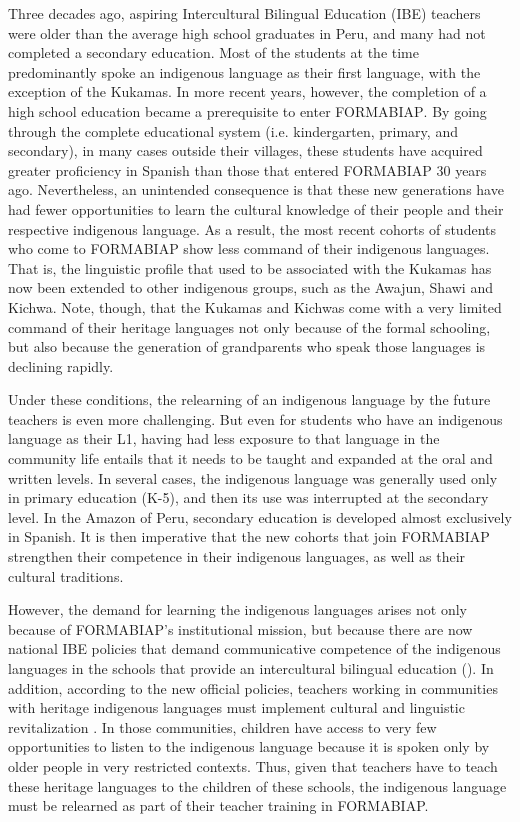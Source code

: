 \documentclass[output=paper]{langscibook}
\begin{document}
Three decades ago, aspiring Intercultural Bilingual Education (IBE) teachers were older than the average high school graduates in Peru, and many had not completed a secondary education. Most of the students at the time predominantly spoke an indigenous language as their first language, with the exception of the Kukamas. In more recent years, however, the completion of a high school education became a prerequisite to enter \textsc{FORMABIAP}. By going through the complete educational system (i.e. kindergarten, primary, and secondary), in many cases outside their villages, these students have acquired greater proficiency in Spanish than those that entered FORMABIAP 30 years ago. Nevertheless, an unintended consequence is that these new generations have had fewer opportunities to learn the cultural knowledge of their people and their respective indigenous language. As a result, the most recent cohorts of students who come to FORMABIAP show less command of their indigenous languages. That is, the linguistic profile that used to be associated with the Kukamas has now been extended to other indigenous groups, such as the Awajun, Shawi and Kichwa. Note, though, that the Kukamas and Kichwas come with a very limited command of their heritage languages not only ​​because of the formal schooling, but also because the generation of grandparents who speak those languages is declining rapidly.

Under these conditions, the relearning of an indigenous language by the future teachers is even more challenging. But even for students who have an indigenous language as their L1, having had less exposure to that language in the community life entails that it needs to be taught and expanded at the oral and written levels. In several cases, the indigenous language was generally used only in primary education (K-5), and then its use was interrupted at the secondary level. In the Amazon of Peru, secondary education is developed almost exclusively in Spanish. It is then imperative that the new cohorts that join FORMABIAP strengthen their competence in their indigenous languages, as well as their cultural traditions.

However, the demand for learning the indigenous languages arises not only because of FORMABIAP’s institutional mission, but because there are now national IBE policies that demand communicative competence of the indigenous languages in the schools that provide an intercultural bilingual education (\citealt{MinisteriodeEducacióndelPerú2016}). In addition, according to the new official policies, teachers working in communities with heritage indigenous languages must implement cultural and linguistic revitalization \citep{MinistryofEducationofPeru2016}. In those communities, children have access to very few opportunities to listen to the indigenous language because it is spoken only by older people in very restricted contexts. Thus, given that teachers have to teach these heritage languages to the children of these schools, the indigenous language must be relearned as part of their teacher training in FORMABIAP.
\end{document}
